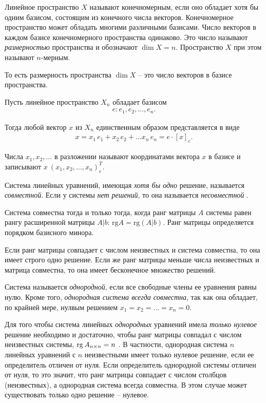 \documentclass[%
	11pt,
	a4paper,
	utf8,
		]{article}
\begin{document}
Линейное пространство $ X $ называют конечномерным, если оно обладает хотя бы одним базисом, состоящим из конечного числа векторов. Конечномерное пространство может обладать многими различными базисами. Число векторов в каждом базисе конечномерного пространства одинаково. Это число называют \emph{размерностью} пространства и обозначают $ \dim X = n $. Пространство $ X $ при этом называют $ n $-мерным.

То есть размерность пространства $ \dim X $ -- это число векторов в базисе пространства.

Пусть линейное пространство $ X_n $ обладает базисом
\begin{align*}
	e: e_1, e_2, \ldots, e_n.
\end{align*}

Тогда любой вектор $ x $ из $ X_n $ единственным образом представляется в виде
\begin{align*}
	x = x_1 \, e_1 + x_2 \, e_2 + \ldots x_n \, e_n = e \cdot [x]_e.
\end{align*}

Числа $ x_1, x_2, \ldots $ в разложении называют координатами вектора $ x $ в базисе и записывают $ x \ (x_1, x_2, \ldots, x_n)^T_e $. 

Система линейных уравнений, имеющая \emph{хотя бы одно} решение, называется \emph{совместной}. Если у системы \emph{нет решений}, то она называется \emph{несовместной} \cite[]{shevtsov:linal-2012}.

Система совместна тогда и только тогда, когда ранг матрицы $ A $ системы равен рангу расширенной матрицы $ A | b $: $ \text{rg} A = \text{rg} (A | b) $. Ранг матрицы определяется порядком базисного минора.

Если ранг матрицы совпадает с числом неизвестных и система совместна, то она имеет строго одно решение. Если же ранг матрицы меньше числа неизвестных и матрица совместна, то она имеет бесконечное множество решений.

Система называется \emph{однородной}, если все свободные члены ее уравнения равны нулю. Кроме того, \emph{однородная система всегда совместна}, так как она обладает, по крайней мере, нулвым решением $ x_1 = x_2 = \ldots = x_n = 0 $.

Для того чтобы система линейных \emph{однородных} уравнений имела \emph{только нулевое} решение необходимо и достаточно, чтобы ранг матрицы совпадал с числом неизвестных системы, $ \operatorname*{rg} A_{n \times n} = n $ \cite[]{shevtsov:linal-2012}. В частности, однородная система $ n $ линейных уравнений с $ n $ неизвестными имеет только нулевое решение, если ее определитель отличен от нуля. Если определитель однородной системы отличен от нуля, то это значит, что ранг матрицы совпадает с числом столбцов (неизвестных), а однородная система всегда совместна. В этом случае может существовать только одно решение -- нулевое.
\end{document}
